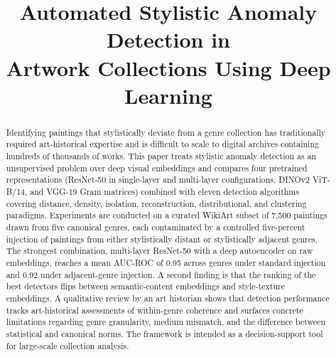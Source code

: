 \documentclass[conference]{IEEEtran}
\begin{document}
\title{Automated Stylistic Anomaly Detection in\\
Artwork Collections Using Deep Learning}

\author{
\and
{}
 }

\maketitle

\begin{abstract}
Identifying paintings that stylistically deviate from a genre collection has traditionally required art-historical expertise and is difficult to scale to digital archives containing hundreds of thousands of works. This paper treats stylistic anomaly detection as an unsupervised problem over deep visual embeddings and compares four pretrained representations (ResNet-50 in single-layer and multi-layer configurations, DINOv2 ViT-B/14, and VGG-19 Gram matrices) combined with eleven detection algorithms covering distance, density, isolation, reconstruction, distributional, and clustering paradigms. Experiments are conducted on a curated WikiArt subset of 7{,}500 paintings drawn from five canonical genres, each contaminated by a controlled five-percent injection of paintings from either stylistically distant or stylistically adjacent genres. The strongest combination, multi-layer ResNet-50 with a deep autoencoder on raw embeddings, reaches a mean AUC-ROC of 0.95 across genres under standard injection and 0.92 under adjacent-genre injection. A second finding is that the ranking of the best detectors flips between semantic-content embeddings and style-texture embeddings. A qualitative review by an art historian shows that detection performance tracks art-historical assessments of within-genre coherence and surfaces concrete limitations regarding genre granularity, medium mismatch, and the difference between statistical and canonical norms. The framework is intended as a decision-support tool for large-scale collection analysis.
\end{abstract}
\end{document}
